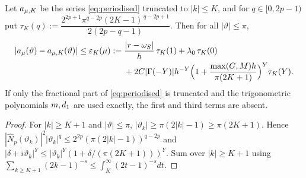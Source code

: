 \begin{lemma}\label{lem:tail}
Let $a_{\mu,K}$ be the series \eqref{eq:periodised} truncated to $|k|\le K$,
and for $q\in[0,2p-1)$ put
$\tau_K(q):=\dfrac{2^{2p+1}\pi^{q-2p}(2K-1)^{\,q-2p+1}}{2(2p-q-1)}$.
Then for all $|\vartheta|\le\pi$,
\begin{equation}
\begin{aligned}
 |a_\mu(\vartheta)-a_{\mu,K}(\vartheta)|
 \le \varepsilon_K(\mu):={}&\frac{|r-\omega_S|}{h}\,\tau_K(1)+\lambda_0\,\tau_K(0)\\
 &+2C|\Gamma(-Y)|h^{-Y}\Bigl(1+\frac{\max(G,M)h}{\pi(2K+1)}\Bigr)^{Y}\tau_K(Y).
\end{aligned}
 \label{eq:tail}
\end{equation}
If only the fractional part of \eqref{eq:periodised} is truncated and the
trigonometric polynomials $m,d_1$ are used exactly, the first and
third terms are absent.
\end{lemma}
\begin{proof}
For $|k|\ge K+1$ and $|\vartheta|\le\pi$, $|\vartheta_k|\ge\pi(2|k|-1)\ge\pi(2K+1)$.
Hence $|\widehat N_p(\vartheta_k)|^2|\vartheta_k|^q\le2^{2p}(\pi(2|k|-1))^{q-2p}$ and
$|\delta+i\vartheta_k|^Y\le|\vartheta_k|^Y(1+\delta/(\pi(2K+1)))^Y$.  Sum over
$|k|\ge K+1$ using $\sum_{k\ge K+1}(2k-1)^{-s}\le\int_K^\infty(2t-1)^{-s}dt$.
\end{proof}
